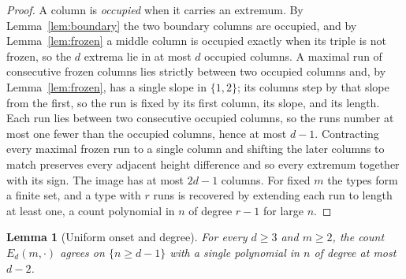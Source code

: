 \documentclass[11pt]{article}
\newtheorem{lemma}[theorem]{Lemma}
\theoremstyle{definition}
\theoremstyle{remark}
\begin{document}
\begin{proof}
A column is \emph{occupied} when it carries an extremum. By
Lemma~\ref{lem:boundary} the two boundary columns are occupied, and by
Lemma~\ref{lem:frozen} a middle column is occupied exactly when its triple is not
frozen, so the $d$ extrema lie in at most $d$ occupied columns. A maximal run of
consecutive frozen columns lies strictly between two occupied columns and, by
Lemma~\ref{lem:frozen}, has a single slope in $\{1,2\}$; its columns step by that
slope from the first, so the run is fixed by its first column, its slope, and its
length. Each run lies between two consecutive occupied columns, so the runs number
at most one fewer than the occupied columns, hence at most $d-1$. Contracting every maximal frozen run to a single column and shifting
the later columns to match preserves every adjacent height difference and so
every extremum together with its sign. The image has at
most $2d-1$ columns. For fixed $m$ the types form a finite set, and a type with
$r$ runs is recovered by extending each run to length at least one, a count
polynomial in $n$ of degree $r-1$ for large $n$.
\end{proof}

\begin{lemma}[Uniform onset and degree]\label{lem:uniform}
For every $d\ge3$ and $m\ge2$, the count $E_d(m,\cdot)$ agrees on
$\{n\ge d-1\}$ with a single polynomial in $n$ of degree at most $d-2$.
\end{lemma}
\end{document}
